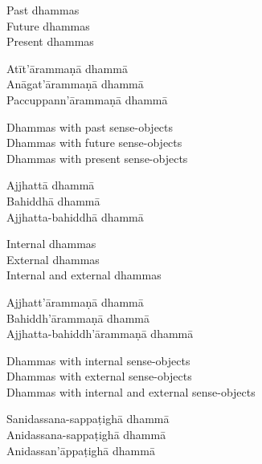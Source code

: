 \begin{english-verses}
  Past dhammas\\
  Future dhammas\\
  Present dhammas
\end{english-verses}

\begin{pali-hang-continued}
  Atīt'ārammaṇā dhammā\\
  Anāgat'ārammaṇā dhammā\\
  Paccuppann'ārammaṇā dhammā
\end{pali-hang-continued}

\begin{english-verses}
  Dhammas with past sense-objects\\
  Dhammas with future sense-objects\\
  Dhammas with present sense-objects
\end{english-verses}

\ifbfive\clearpage\fi

\begin{pali-hang-continued}
  Ajjhattā dhammā\\
  Bahiddhā dhammā\\
  Ajjhatta-bahiddhā dhammā
\end{pali-hang-continued}

\ifafive\clearpage\fi

\begin{english-verses}
  Internal dhammas\\
  External dhammas\\
  Internal and external dhammas
\end{english-verses}

\begin{pali-hang-continued}
  Ajjhatt'ārammaṇā dhammā\\
  Bahiddh'ārammaṇā dhammā\\
  Ajjhatta-bahiddh'ārammaṇā dhammā
\end{pali-hang-continued}

\begin{english-verses}
  Dhammas with internal sense-objects\\
  Dhammas with external sense-objects\\
  Dhammas with internal and external sense-objects
\end{english-verses}

\begin{pali-hang-continued}
  Sanidassana-sappaṭighā dhammā\\
  Anidassana-sappaṭighā dhammā\\
  Anidassan'āppaṭighā dhammā
\end{pali-hang-continued}

